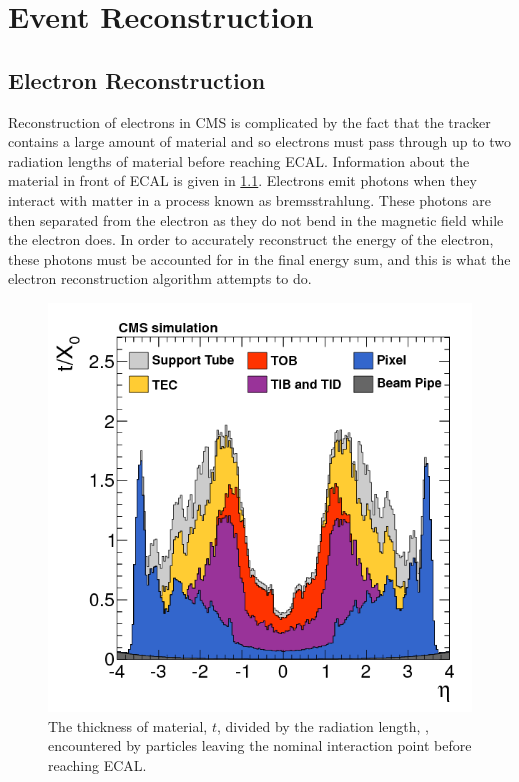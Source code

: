 \chapter{Event Reconstruction}
\label{chapter:reconstruction}

\section{Electron Reconstruction}
\label{sec:electron_reconstruction}

Reconstruction of electrons in CMS is complicated by the fact that the tracker
contains a large amount of material and so electrons must pass through up to
two radiation lengths of material before reaching ECAL. Information about the
material in front of ECAL is given in
\cref{fig:tracker_material}\cite{cms_tracker_2014}. Electrons emit photons
when they interact with matter in a process known as bremsstrahlung. These
photons are then separated from the electron as they do not bend in the
magnetic field while the electron does. In order to accurately reconstruct the
energy of the electron, these photons must be accounted for in the final energy
sum, and this is what the electron reconstruction algorithm attempts to do.

\begin{figure}[!htbp]
    \centering
    \includegraphics[width=\textwidth]{figures/tracker_material_budget.png}
    \caption[
        Material thickness infront of of ECAL.
    ]{
        The thickness of material, $t$, divided by the radiation length,
        \radiationlength, encountered by particles leaving the nominal
        interaction point before reaching ECAL.
    }
    \label{fig:tracker_material}
\end{figure}

